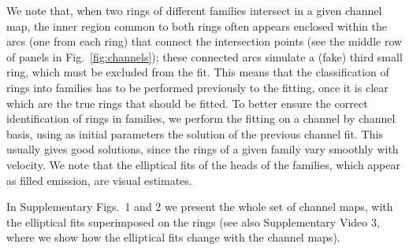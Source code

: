 \documentclass[12pt]{mythesis}
\begin{document}
We note that, when two rings of different families intersect in a given channel map, the inner region common to both rings often appears enclosed within the arcs (one from each ring) that connect the intersection points (see the middle row of panels in Fig.~\ref{fig:channels}); these connected arcs simulate a (fake) third small ring, which must be excluded from the fit.
This means that the classification of rings into families has to be performed previously to the fitting, once it is clear which are the true rings that should be fitted.
To better ensure the correct identification of rings in families, we perform the fitting on a channel by channel basis, using as initial parameters the solution of the previous channel fit. This usually gives good solutions, since the rings of a given family vary smoothly with velocity. We note that the elliptical fits of the heads of the families, which appear as filled emission, are visual estimates.

In Supplementary Figs.~1 and 2 we present the whole set of channel maps, with the elliptical fits superimposed on the rings (see also Supplementary Video 3, where we show how the elliptical fits change with the channel maps).
\end{document}
